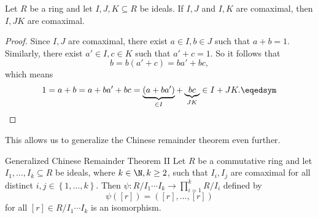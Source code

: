 \documentclass[pmath347]{subfiles}
\begin{document}
    \begin{prop}{}
        Let $R$ be a ring and let $I,J,K\subseteq R$ be ideals. If $I,J$ and $I,K$ are comaximal, then $I,JK$ are comaximal.
    \end{prop}

    \begin{proof}
        Since $I,J$ are comaximal, there exist $a\in I, b\in J$ such that $a+b = 1$. Similarly, there exist $a'\in I, c\in K$ such that $a'+c=1$. So it follows that
        \begin{equation*}
            b = b\left( a'+c \right) = ba' + bc,
        \end{equation*}
        which means
        \begin{equation*}
            1 = a+b = a + ba' + bc = \underbrace{\left( a+ba' \right)}_{\in I} + \underbrace{bc}_{JK} \in I+JK. \eqedsym
        \end{equation*}
    \end{proof}

    \noindent This allows us to generalize the Chinese remainder theorem even further.
    
    \begin{theorem}{Generalized Chinese Remainder Theorem II}
        Let $R$ be a commutative ring and let $I_1,\ldots,I_k\subseteq R$ be ideals, where $k\in\N, k\geq 2$, such that $I_i,I_j$ are comaximal for all distinct $i,j\in \left\lbrace 1,\ldots,k \right\rbrace$. Then $\psi:R /I_1\cdots I_k\to \prod^{k}_{i=1} R /I_i$ defined by
            \begin{equation*}
                \psi\left( \left[ r \right]  \right) = \left( \left[ r \right] ,\ldots,\left[ r \right]  \right) 
            \end{equation*}
            for all $\left[ r \right] \in R / I_1\cdots I_k$ is an isomorphism.
    \end{theorem}

    
    
    
    
    
    
    
    
    
    
    
    
    
    
    
    
    
    
    
    
    
    
    
    
    
    
    
    
    
    
    
    
    
    
    
    
    
    
    
\end{document}

